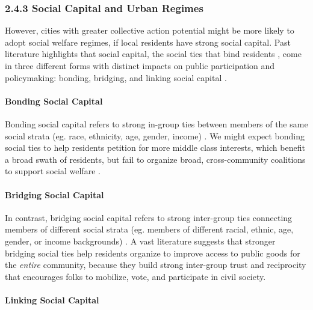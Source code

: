 \documentclass[preprint, 3p,
authoryear]{elsarticle} %
\begin{document}
\hypertarget{social-capital-and-urban-regimes}{%
\subsubsection{2.4.3 Social Capital and Urban
Regimes}\label{social-capital-and-urban-regimes}}

However, cities with greater collective action potential might be more
likely to adopt social welfare regimes, if local residents have strong
social capital. Past literature highlights that social capital, the
social ties that bind residents \citep{putnam_2000, woolcock_2010}, come
in three different forms with distinct impacts on public participation
and policymaking: bonding, bridging, and linking social capital
\citep{aldrich_and_meyer_2015}.

\hypertarget{bonding-social-capital}{%
\paragraph{Bonding Social Capital}\label{bonding-social-capital}}

Bonding social capital refers to strong in-group ties between members of
the same social strata (eg. race, ethnicity, age, gender, income)
\citep{mcpherson_et_al_2001, mouw_2006}. We might expect bonding social
ties to help residents petition for more middle class interests, which
benefit a broad swath of residents, but fail to organize broad,
cross-community coalitions to support social welfare
\citep{tsai_2007, cox_2011, alcorta_et_al_2020}.

\hypertarget{bridging-social-capital}{%
\paragraph{Bridging Social Capital}\label{bridging-social-capital}}

In contrast, bridging social capital refers to strong inter-group ties
connecting members of different social strata (eg. members of different
racial, ethnic, age, gender, or income backgrounds)
\citep{putnam_2000, aldrich_2019}. A vast literature suggests that
stronger bridging social ties help residents organize to improve access
to public goods for the \emph{entire} community, because they build
strong inter-group trust and reciprocity that encourages folks to
mobilize, vote, and participate in civil society.

\hypertarget{linking-social-capital}{%
\paragraph{Linking Social Capital}\label{linking-social-capital}}
\end{document}
